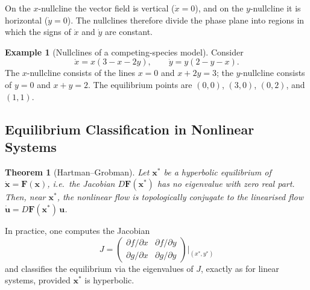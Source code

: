 \documentclass[12pt,a4paper,openany]{book}
\theoremstyle{definition}
\newtheorem{example}[definition]{Example}
\theoremstyle{plain}
\newtheorem{theorem}[definition]{Theorem}
\theoremstyle{remark}
\begin{document}
On the $x$-nullcline the vector field is vertical ($\dot{x}=0$),
and on the $y$-nullcline it is horizontal ($\dot{y}=0$). The
nullclines therefore divide the phase plane into regions in which the
signs of $\dot{x}$ and $\dot{y}$ are constant.

\begin{example}[Nullclines of a competing-species model]
\label{ex:nullclines-competition}
Consider
\[
  \dot{x} = x(3-x-2y),\qquad \dot{y} = y(2-y-x).
\]
The $x$-nullcline consists of the lines $x=0$ and $x+2y=3$; the
$y$-nullcline consists of $y=0$ and $x+y=2$. The equilibrium points
are $(0,0)$, $(3,0)$, $(0,2)$, and $(1,1)$.
\end{example}

\begin{center}
\end{center}

\subsection{Equilibrium Classification in Nonlinear Systems}
\label{subsec:equilib-nonlinear}

\begin{theorem}[Hartman--Grobman]
\label{thm:hartman-grobman}
Let $\mathbf{x}^{*}$ be a hyperbolic equilibrium of
$\dot{\mathbf{x}}=\mathbf{F}(\mathbf{x})$, i.e.\ the Jacobian
$D\mathbf{F}(\mathbf{x}^{*})$ has no eigenvalue with zero real part.
Then, near $\mathbf{x}^{*}$, the nonlinear flow is topologically
conjugate to the linearised flow
$\dot{\mathbf{u}}=D\mathbf{F}(\mathbf{x}^{*})\,\mathbf{u}$.
\end{theorem}

In practice, one computes the Jacobian
\[
  J = \begin{pmatrix}
    \partial f/\partial x & \partial f/\partial y \\
    \partial g/\partial x & \partial g/\partial y
  \end{pmatrix}\bigg|_{(x^{*},y^{*})}
\]
and classifies the equilibrium via the eigenvalues of $J$, exactly as
for linear systems, provided $\mathbf{x}^{*}$ is hyperbolic.
\end{document}
